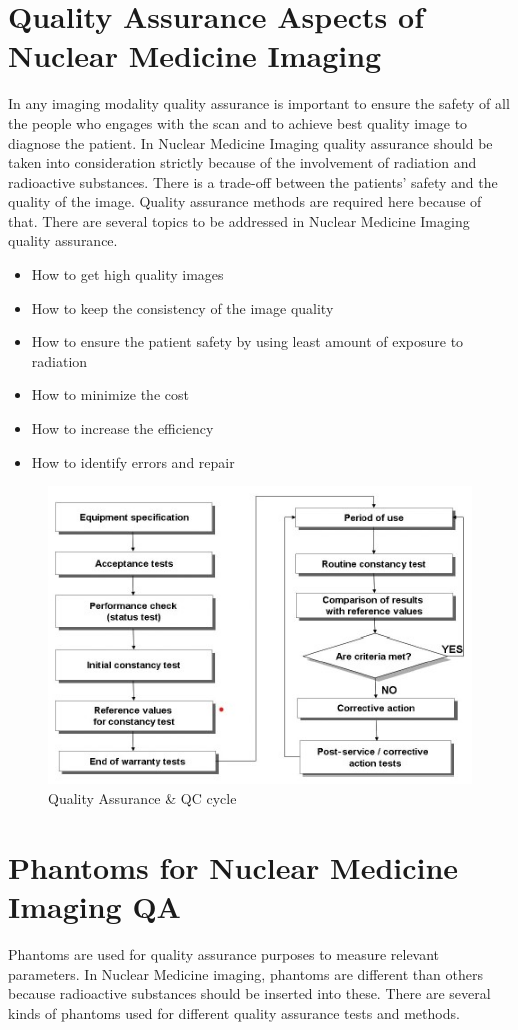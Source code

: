 \documentclass[12pt]{article}
\def \topic{Nuclear Medicine Imaging}
\begin{document}
\pagebreak
\section{Quality Assurance Aspects of \topic}
In any imaging modality quality assurance is important to ensure the safety of all the people who engages with the scan and to achieve best quality image to diagnose the patient. In Nuclear Medicine Imaging quality assurance should be taken into consideration strictly because of the involvement of radiation and radioactive substances. There is a trade-off between the patients' safety and the quality of the image. Quality assurance methods are required here because of that. There are several topics to be addressed in Nuclear Medicine Imaging quality assurance. 
\begin{itemize}
    \item How to get high quality images 
    \item How to keep the consistency of the image quality
    \item How to ensure the patient safety by using least amount of exposure to radiation
    \item How to minimize the cost
    \item How to increase the efficiency
    \item How to identify errors and repair
\end{itemize}
\begin{figure}[h!]
    \centering
    \includegraphics[width=0.65\linewidth]{cycle.jpg}
    \caption{\small{Quality Assurance \& QC cycle}}
    \label{fig:Quality Assurance & QC cycle}
\end{figure}



\section{Phantoms for Nuclear Medicine Imaging QA}
Phantoms are used for quality assurance purposes to measure relevant parameters. In Nuclear Medicine imaging, phantoms are different than others because radioactive substances should be inserted into these. There are several kinds of phantoms used for different quality assurance tests and methods. 
\end{document}
